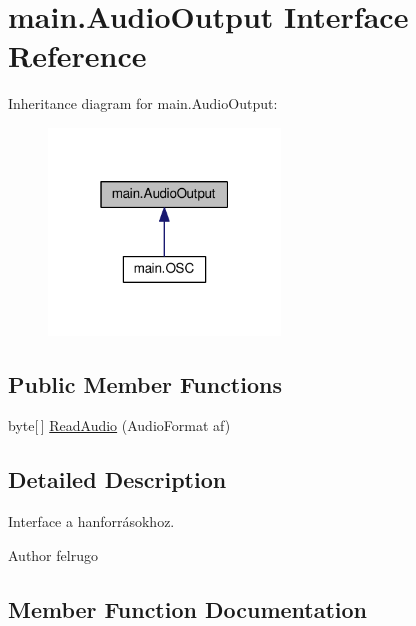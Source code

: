 \hypertarget{interfacemain_1_1_audio_output}{}\section{main.\+Audio\+Output Interface Reference}
\label{interfacemain_1_1_audio_output}


Inheritance diagram for main.\+Audio\+Output\+:
\nopagebreak
\begin{figure}[H]
\begin{center}
\leavevmode
\includegraphics[width=175pt]{interfacemain_1_1_audio_output__inherit__graph}
\end{center}
\end{figure}
\subsection*{Public Member Functions}
\begin{DoxyCompactItemize}
\item 
byte\mbox{[}$\,$\mbox{]} \hyperlink{interfacemain_1_1_audio_output_aed68b68455b448c96d691b11de8c1630}{Read\+Audio} (Audio\+Format af)
\end{DoxyCompactItemize}


\subsection{Detailed Description}
Interface a hanforrásokhoz. \begin{DoxyAuthor}{Author}
felrugo 
\end{DoxyAuthor}


\subsection{Member Function Documentation}
